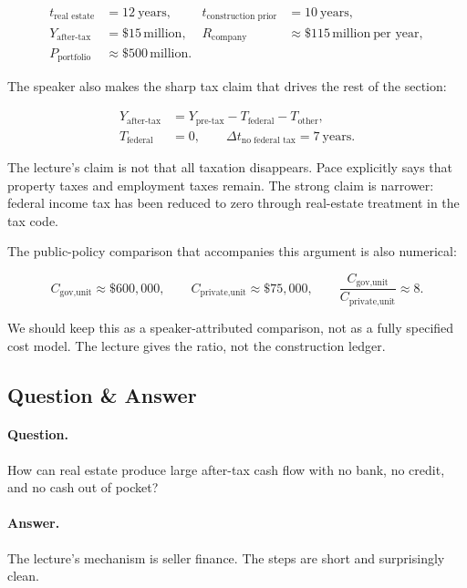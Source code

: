\begin{align}
t_{\text{real estate}}&=12\ \text{years},
&
t_{\text{construction prior}}&=10\ \text{years},\\
Y_{\text{after-tax}}&=\$15\,\text{million},
&
R_{\text{company}}&\approx \$115\,\text{million}\ \text{per year},\\
P_{\text{portfolio}}&\approx \$500\,\text{million}.&
\end{align}

The speaker also makes the sharp tax claim that drives the rest of the section:

\begin{align}
Y_{\text{after-tax}}&=Y_{\text{pre-tax}}-T_{\text{federal}}-T_{\text{other}},\\
T_{\text{federal}}&=0,
\qquad
\Delta t_{\text{no federal tax}}=7\ \text{years}.
\end{align}

\begin{remark}
The lecture's claim is not that all taxation disappears. Pace explicitly says that property taxes and employment taxes remain. The strong claim is narrower: federal income tax has been reduced to zero through real-estate treatment in the tax code.
\end{remark}

The public-policy comparison that accompanies this argument is also numerical:

\begin{equation}
C_{\text{gov,unit}}\approx \$600{,}000,
\qquad
C_{\text{private,unit}}\approx \$75{,}000,
\qquad
\frac{C_{\text{gov,unit}}}{C_{\text{private,unit}}}\approx 8.
\end{equation}

We should keep this as a speaker-attributed comparison, not as a fully specified cost model. The lecture gives the ratio, not the construction ledger.

\subsection{Question \& Answer}

\paragraph{Question.} How can real estate produce large after-tax cash flow with no bank, no credit, and no cash out of pocket?

\paragraph{Answer.} The lecture's mechanism is seller finance. The steps are short and surprisingly clean.

